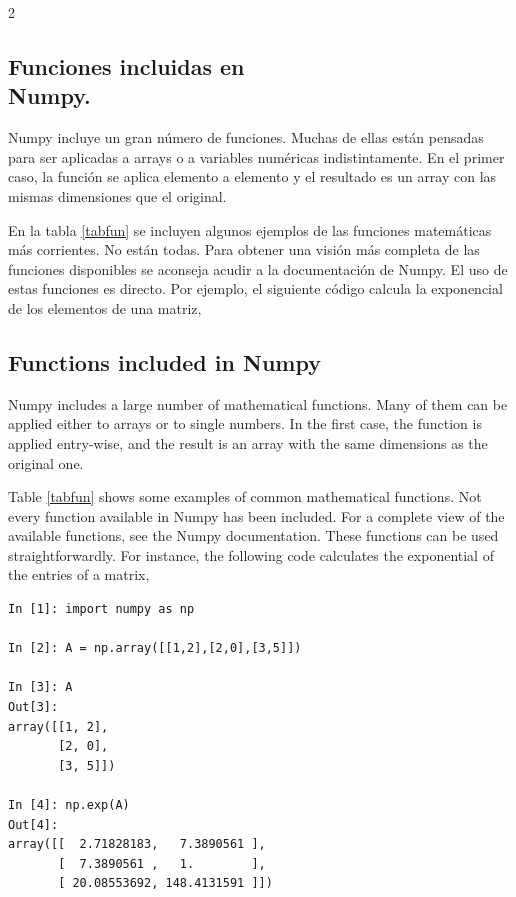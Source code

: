 \begin{paracol}{2}
\subsection{Funciones incluidas en\\ Num\-py.} 
Numpy incluye un gran número de funciones. Muchas de ellas  están pensadas para ser aplicadas a arrays o a variables numéricas indistintamente. En el primer caso, la función se aplica elemento a elemento y el resultado es un array con las mismas dimensiones que el original. 

En la tabla \ref{tabfun} se incluyen algunos ejemplos de las funciones matemáticas más corrientes. No están todas. Para obtener una visión más completa de las funciones disponibles se aconseja acudir a la documentación de Numpy.
El uso de estas funciones es directo. Por ejemplo, el siguiente código calcula la exponencial de los elementos de una matriz,
\switchcolumn
\subsection{Functions included in Numpy}
Numpy includes a large number of mathematical functions. Many of them can be applied either to arrays or to single numbers. In the first case, the function is applied entry-wise, and the result is an array with the same dimensions as the original one.

Table \ref{tabfun} shows some examples of common mathematical functions. Not every function available in Numpy has been included. For a complete view of the available functions, see the Numpy documentation.
These functions can be used straightforwardly. For instance, the following code calculates the exponential of the entries of a matrix,   
\end{paracol}

\begin{center}
    \begin{minipage}{0.5\textwidth}
        \begin{verbatim}
In [1]: import numpy as np

In [2]: A = np.array([[1,2],[2,0],[3,5]])

In [3]: A
Out[3]: 
array([[1, 2],
       [2, 0],
       [3, 5]])

In [4]: np.exp(A)
Out[4]: 
array([[  2.71828183,   7.3890561 ],
       [  7.3890561 ,   1.        ],
       [ 20.08553692, 148.4131591 ]])
        \end{verbatim}
    \end{minipage}
\end{center}

